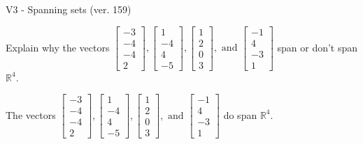 \begin{exercise}
  \begin{exerciseTitle}V3 - Spanning sets (ver. 159)\end{exerciseTitle}
  \begin{exerciseStatement}
    Explain why the vectors \(\left[\begin{array}{r}
-3 \\
-4 \\
-4 \\
2
\end{array}\right] , \left[\begin{array}{r}
1 \\
-4 \\
4 \\
-5
\end{array}\right] , \left[\begin{array}{r}
1 \\
2 \\
0 \\
3
\end{array}\right] , \text{ and } \left[\begin{array}{r}
-1 \\
4 \\
-3 \\
1
\end{array}\right]\) span or don't span \(\mathbb{R}^4\). 
	


  \end{exerciseStatement}
  \begin{exerciseAnswer}
   The vectors \(\left[\begin{array}{r}
-3 \\
-4 \\
-4 \\
2
\end{array}\right] , \left[\begin{array}{r}
1 \\
-4 \\
4 \\
-5
\end{array}\right] , \left[\begin{array}{r}
1 \\
2 \\
0 \\
3
\end{array}\right] , \text{ and } \left[\begin{array}{r}
-1 \\
4 \\
-3 \\
1
\end{array}\right]\) 
  	 do  
	span \(\mathbb{R}^4\).
  


  \end{exerciseAnswer}
\end{exercise}